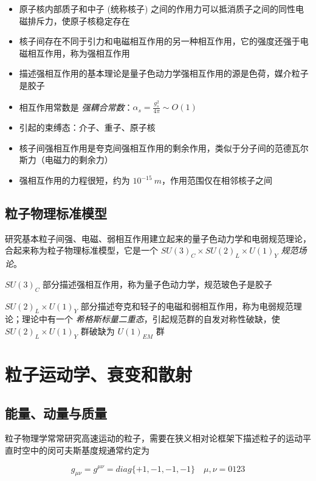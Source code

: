\begin{itemize}
    \item 原子核内部质子和中子 (统称核子) 之间的作用力可以抵消质子之间的同性电磁排斥力，使原子核稳定存在
    \item 核子间存在不同于引力和电磁相互作用的另一种相互作用，它的强度还强于电磁相互作用，称为强相互作用
    \item 描述强相互作用的基本理论是量子色动力学强相互作用的源是色荷，媒介粒子是胶子
    \item 相互作用常数是 \emph{强耦合常数}：$\alpha_s=\frac{g_s^2}{4\pi} \sim O(1)$
    \item 引起的束缚态：介子、重子、原子核
    \item 核子间强相互作用是夸克间强相互作用的剩余作用，类似于分子间的范德瓦尔斯力（电磁力的剩余力）
    \item 强相互作用的力程很短，约为 $10^{-15}\ m$，作用范围仅在相邻核子之间
\end{itemize}

\subsection{粒子物理标准模型}

研究基本粒子间强、电磁、弱相互作用建立起来的量子色动力学和电弱规范理论，合起来称为粒子物理标准模型，它是一个 $SU(3)_C \times SU(2)_L \times U(1)_Y$ \emph{规范场论}。

$SU(3)_C$ 部分描述强相互作用，称为量子色动力学，规范玻色子是胶子

$SU(2)_L \times U(1)_Y$ 部分描述夸克和轻子的电磁和弱相互作用，称为电弱规范理论；理论中有一个 \emph{希格斯标量二重态}，引起规范群的自发对称性破缺，使 $SU(2)_L \times U(1)_Y$ 群破缺为 $U(1)_{EM}$ 群

\section{粒子运动学、衰变和散射}

\subsection{能量、动量与质量}

粒子物理学常常研究高速运动的粒子，需要在狭义相对论框架下描述粒子的运动平直时空中的闵可夫斯基度规通常约定为

\begin{equation}
    g_{\mu\nu}=g^{\mu\nu}=diag\{+1,-1,-1,-1\}\quad \mu,\nu=0123
\end{equation}

